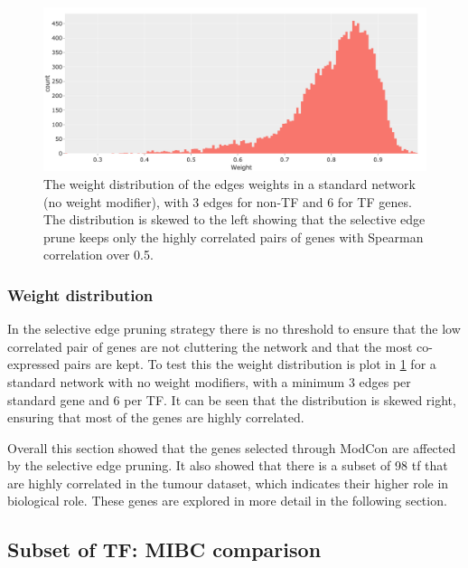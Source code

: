 \begin{figure}[!b]   
\centering
\includegraphics[width=1.0\textwidth,height=1.0\textheight,keepaspectratio]{Sections/Network_I/Resources/selective_pruning/weight_distrib.png}
  \caption[Weight distribution]{The weight distribution of the edges weights in a standard network (no weight modifier), with 3 edges for non-TF and 6 for TF genes. The distribution is skewed to the left showing that the selective edge prune keeps only the highly correlated pairs of genes with Spearman correlation over 0.5. }
\label{fig:N_I:weight_distrib}
\end{figure}

\subsubsection*{Weight distribution}

In the selective edge pruning strategy there is no threshold to ensure that the low correlated pair of genes are not cluttering the network and that the most co-expressed pairs are kept. To test this the weight distribution is plot in \cref{fig:N_I:weight_distrib} for a standard network with no weight modifiers, with a minimum 3 edges per standard gene and 6 per TF. It can be seen that the distribution is skewed right, ensuring that most of the genes are highly correlated.


Overall this section showed that the genes selected through ModCon are affected by the selective edge pruning. It also showed that there is a subset of 98 \acrlong{tf} that are highly correlated in the tumour dataset, which indicates their higher role in biological role. These genes are explored in more detail in the following section.


\subsection{Subset of TF: MIBC comparison} \label{s:N_I:sel_tfs_mibc}

